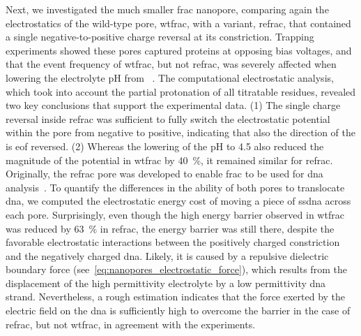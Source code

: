 Next, we investigated the much smaller \gls{frac} nanopore, comparing again the electrostatics of the
wild-type pore, \gls{wtfrac}, with a variant, \gls{refrac}, that contained a single negative-to-positive
charge reversal at its constriction. Trapping experiments showed these pores captured proteins at opposing
bias voltages, and that the event frequency of \gls{wtfrac}, but not \gls{refrac}, was severely affected when
lowering the electrolyte pH from ~\cite{Huang-2017}. The computational electrostatic
analysis, which took into account the partial protonation of all titratable residues, revealed two key
conclusions that support the experimental data. (1) The single charge reversal inside \gls{refrac} was
sufficient to fully switch the electrostatic potential within the pore \lumen{} from negative to positive,
indicating that also the direction of the is \gls{eof} reversed. (2) Whereas the lowering of the pH to 4.5
also reduced the magnitude of the potential in \gls{wtfrac} by \SI{40}{\percent}, it remained similar for
\gls{refrac}. Originally, the \gls{refrac} pore was developed to enable \gls{frac} to be used for \gls{dna}
analysis~\cite{Wloka-2016}. To quantify the differences in the ability of both pores to translocate \gls{dna},
we computed the electrostatic energy cost of moving a piece of \gls{ssdna} across each pore. Surprisingly,
even though the high energy barrier observed in \gls{wtfrac} was reduced by \SI{63}{\percent} in \gls{refrac},
the energy barrier was still there, despite the favorable electrostatic interactions between the positively
charged constriction and the negatively charged \gls{dna}. Likely, it is caused by a repulsive dielectric
boundary force (see~\cref{eq:nanopores_electrostatic_force}), which results from the displacement of the high
permittivity electrolyte by a low permittivity \gls{dna} strand. Nevertheless, a rough estimation indicates
that the force exerted by the electric field on the \gls{dna} is sufficiently high to overcome the
barrier in the case of \gls{refrac}, but not \gls{wtfrac}, in agreement with the experiments.


